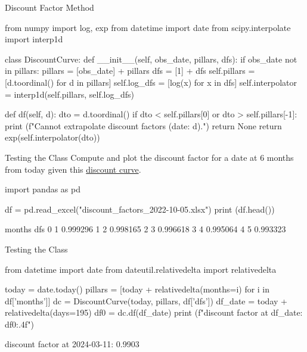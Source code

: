 \documentclass{beamer}
\begin{document}
\begin{frame}[fragile]{Discount Factor Method}
\begin{ipython}
from numpy import log, exp
from datetime import date
from scipy.interpolate import interp1d  
	
class DiscountCurve:
    def __init__(self, obs_date, pillars, dfs):
        if obs_date not in pillars:
            pillars = [obs_date] + pillars
            dfs = [1] + dfs
        self.pillars = [d.toordinal() for d in pillars]
        self.log_dfs = [log(x) for x in dfs]
        self.interpolator = interp1d(self.pillars, self.log_dfs)
        
  def df(self, d):
    dto = d.toordinal()   
    if dto < self.pillars[0] or dto > self.pillars[-1]:
      print (f"Cannot extrapolate discount factors (date: {d}).")
      return None
    return exp(self.interpolator(dto))
\end{ipython}
\end{frame}

\begin{frame}[fragile]{Testing the Class}
Compute and plot the discount factor for a date at 6 months from today given this \href{https://github.com/matteosan1/finance_course/raw/develop/input_files/discount_factors_2022-10-05.xlsx}{discount curve}.
\begin{ipython}
import pandas as pd

df = pd.read_excel("discount_factors_2022-10-05.xlsx")
print (df.head())
\end{ipython}
\begin{ioutput}
   months       dfs
0       1  0.999296
1       2  0.998165
2       3  0.996618
3       4  0.995064
4       5  0.993323
\end{ioutput}
\end{frame}

\begin{frame}[fragile]{Testing the Class}
\begin{ipython}
from datetime import date
from dateutil.relativedelta import relativedelta

today = date.today()
pillars = [today + relativedelta(months=i) for i in df['months']]
dc = DiscountCurve(today, pillars, df['dfs'])
df_date = today + relativedelta(days=195)
df0 = dc.df(df_date)
print (f"discount factor at {df_date}: {df0:.4f}")
\end{ipython}
\begin{ioutput}
discount factor at 2024-03-11: 0.9903
\end{ioutput}
\end{frame}
\end{document}
